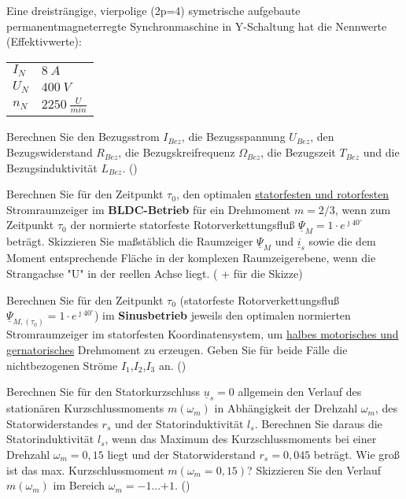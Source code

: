 \begin{question}[section=1,name={18.1.2017},mode=exm,type=bsp,tags={20170118,20170221}]
	Eine dreisträngige, vierpolige (2p=4) symetrische aufgebaute permanentmagneterregte Synchronmaschine in Y-Schaltung hat die Nennwerte (Effektivwerte):\\
	\begin{tabular}{L{2cm}l}
		$I_{N}$ \dotfill &$8~A$\\
		$U_{N}$ \dotfill & $400~V$ \\
		$n_N$ \dotfill & $2250~\frac{U}{min}$\\
	\end{tabular}
	\begin{compactenum}
		\item Berechnen Sie den Bezugsstrom $I_{Bez}$, die Bezugsspannung $U_{Bez}$, den Bezugswiderstand $R_{Bez}$, die Bezugskreifrequenz $\Omega_{Bez}$, die Bezugszeit $T_{Bez}$ und die Bezugsinduktivität $L_{Bez}$. ()
		\item Berechnen Sie für den Zeitpunkt $\tau_0$, den optimalen \underline{statorfesten und rotorfesten} Stromraumzeiger im \textbf{BLDC-Betrieb} für ein Drehmoment $m=2/3$, wenn zum Zeitpunkt $\tau_0$ der normierte statorfeste Rotorverkettungsfluß $\underline{\Psi}_M = 1 \cdot e^{\jmath 40^\circ}$ beträgt. Skizzieren Sie maßstäblich die Raumzeiger $\underline{\Psi}_M$ und $\underline{i}_s$ sowie die dem Moment entsprechende Fläche in der komplexen Raumzeigerebene, wenn die Strangachse "U" in der reellen Achse liegt. ( +  für die Skizze)
		\item Berechnen Sie für den Zeitpunkt $\tau_0$ (statorfeste Rotorverkettungsfluß $\underline{\Psi}_{M,(\tau_0)} = 1\cdot e^{\jmath 40^\circ}$) im \textbf{Sinusbetrieb} jeweils den optimalen normierten Stromraumzeiger im statorfesten Koordinatensystem, um \underline{halbes motorisches und gernatorisches} Drehmoment zu erzeugen. Geben Sie für beide Fälle die nichtbezogenen Ströme $I_1$,$I_2$,$I_3$ an. ()
		\item Berechnen Sie für den Statorkurzschluss $\underline{u}_s =0$ allgemein den Verlauf des stationären Kurzschlussmoments $m(\omega_m)$ in Abhängigkeit der Drehzahl $\omega_m$, des Statorwiderstandes $r_s$ und der Statorinduktivität $l_s$. Berechnen Sie daraus die Statorinduktivität $l_s$, wenn das Maximum des Kurzschlussmoments bei einer Drehzahl $\omega_m = 0,15$ liegt und der Statorwiderstand $r_s = 0,045$ beträgt. Wie groß ist das max. Kurzschlussmoment $m(\omega_m = 0,15)$? Skizzieren Sie den Verlauf $m(\omega_m)$ im Bereich $\omega_m =-1$...$+1$. ()
	\end{compactenum}
\end{question}
\begin{solution}
	
\end{solution}